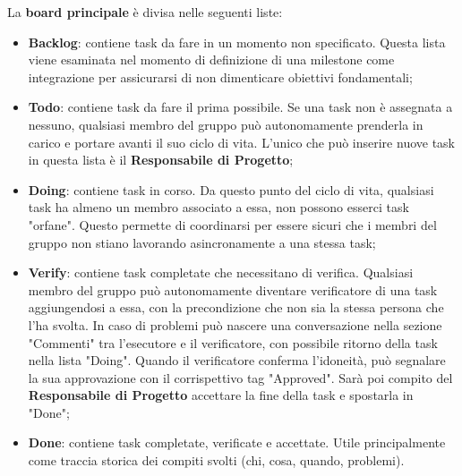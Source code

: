 La \textbf{board principale} è divisa nelle seguenti liste:
\begin{itemize}
  \item \textbf{Backlog}: contiene task da fare in un momento non specificato. Questa lista viene esaminata nel momento di definizione di una milestone come integrazione per assicurarsi di non dimenticare obiettivi fondamentali;
  \item \textbf{Todo}: contiene task da fare il prima possibile. Se una task non è assegnata a nessuno, qualsiasi membro del gruppo può autonomamente prenderla in carico e portare avanti il suo ciclo di vita. L'unico che può inserire nuove task in questa lista è il \textbf{Responsabile di Progetto};
  \item \textbf{Doing}: contiene task in corso. Da questo punto del ciclo di vita, qualsiasi task ha almeno un membro associato a essa, non possono esserci task "orfane". Questo permette di coordinarsi per essere sicuri che i membri del gruppo non stiano lavorando asincronamente a una stessa task;
  \item \textbf{Verify}: contiene task completate che necessitano di verifica. Qualsiasi membro del gruppo può autonomamente diventare verificatore di una task aggiungendosi a essa, con la precondizione che non sia la stessa persona che l'ha svolta. In caso di problemi può nascere una conversazione nella sezione "Commenti" tra l'esecutore e il verificatore, con possibile ritorno della task nella lista "Doing". Quando il verificatore conferma l'idoneità, può segnalare la sua approvazione con il corrispettivo tag "Approved". Sarà poi compito del \textbf{Responsabile di Progetto} accettare la fine della task e spostarla in "Done";
  \item \textbf{Done}: contiene task completate, verificate e accettate. Utile principalmente come traccia storica dei compiti svolti (chi, cosa, quando, problemi).
\end{itemize}

